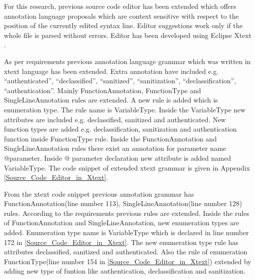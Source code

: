 For this research, previous source code editor \cite{ref_108_paul2015infoflow} has been extended which offers annotation language proposals which are context sensitive with respect to the position of the currently edited syntax line. Editor suggestions work only if the whole file is parsed without errors. Editor has been developed using Eclipse Xtext \cite{ref_17_xtext:grammar}.

As per requirements previous annotation language grammar \cite{ref_108_paul2015infoflow} which was written in xtext language has been extended. Extra annotation have included e.g. \enquote{authenticated}, \enquote{declassified}, \enquote{sanitized}, \enquote{sanitization}, \enquote{declassification}, \enquote{authentication}. Mainly FunctionAnnotation, FunctionType  and SingleLineAnnotation rules  are extended. A new rule is added which is enumeration type. The rule name is VariableType. Inside the VariableType new attributes are included e.g. declassified, sanitized and authenticated. New function types are added e.g. declassification, sanitization and authentication function inside FunctionType rule. Inside the FunctionAnnotation and SingleLineAnnotation rules there exist an annotation for parameter name @parameter. Inside @ parameter declaration new attribute is added named VariableType. The code snippet of extended xtext grammar is given in Appendix  \ref{Source_Code_Editor_in_Xtext}. 


From the xtext code snippet previous annotation grammar \cite{ref_108_paul2015infoflow} has FunctionAnnotation(line number 113), SingleLineAnnotation(line number 128) rules. According to the requirements previous rules are extended. Inside the rules of FunctionAnnotation and SingleLineAnnotation, new enumeration types are added. Enumeration type name is VariableType which is declared in line number 172 in \ref{Source_Code_Editor_in_Xtext}. The new enumeration type rule has attributes declassified, sanitized and authenticated. Also the rule of enumeration FunctionType(line number 154 in \ref{Source_Code_Editor_in_Xtext}) extended by adding new type of funtion like authentication, declassification and sanitization.

